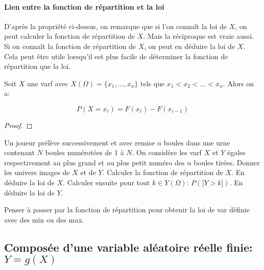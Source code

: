 \documentclass[a4paper, 11pt]{article}
\begin{document}
\paragraph{Lien entre la fonction de r\'epartition et la loi}

 D'apr\`{e}s la propri\'et\'e ci-dessus, on remarque que si l'on conna\^it la loi de $X$, on peut calculer la fonction de r\'epartition de $X$. Mais la r\'eciproque est vraie aussi. Si on conna\^it la fonction de r\'epartition de $X$, on peut en d\'eduire la loi de $X$. Cela peut \^etre utile lorsqu'il est plus facile de d\'eterminer la fonction de r\'epartition que la loi. \vsec\vsec

   

\begin{prop} 
Soit $X$ une varf avec $X(\Omega)=\lbrace x_1,\dots, x_n\rbrace$ tels que $x_1<x_2<\dots<x_n$. Alors on a:\vsec
 
 $$P(X=x_i) = F(x_i) -F(x_{i-1})$$

\end{prop}
 


\begin{proof}

\end{proof}

{\footnotesize \begin{exercice} Un joueur pr\'el\`eve successivement et avec remise $n$ boules dans une urne contenant $N$ boules num\'erot\'ees de 1 \`a $N$. On consid\`ere les varf $X$ et $Y$ \'egales respectivement au plus grand et au plus petit num\'ero des $n$ boules tir\'ees. Donner les univers images de $X$ et de $Y$. Calculer la fonction de r\'epartition de $X$. En d\'eduire la loi de $X$. Calculer ensuite pour tout $k\in Y(\Omega)$: $P(\lbrack Y>k\rbrack)$. En d\'eduire la loi de $Y$.
\end{exercice}}\vsec\vsec



Penser \`{a} passer par la fonction de r\'epartition pour obtenir la loi de var d\'efinie avec des min ou des max.


\subsection{Compos\'ee d'une variable al\'eatoire r\'eelle finie: $Y=g(X)$}
\end{document}

